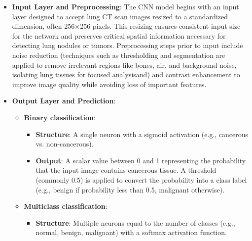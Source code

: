\begin{itemize}
    \item \textbf{Input Layer and Preprocessing}: The CNN model begins with an input layer designed 
    to accept lung CT scan images resized to a standardized dimension, often 256×256 pixels. This 
    resizing ensures consistent input size for the network and preserves critical spatial 
    information necessary for detecting lung nodules or tumors. Preprocessing steps prior to input 
    include noise reduction (techniques such as thresholding and segmentation are applied to remove 
    irrelevant regions like bones, air, and background noise, isolating lung tissues for focused 
    analysisand) and contrast enhancement to improve image quality while avoiding loss of important 
    features.\cite{aplb2024}

    \item \textbf{Output Layer and Prediction}: 
        \begin{itemize}
            \item \textbf{Binary classification}:
                \begin{itemize}
                    \item \textbf{Structure}: A single neuron with a sigmoid activation (e.g., 
                    cancerous vs. non-cancerous).
                    
                    \item \textbf{Output}: A scalar value between 0 and 1 representing the 
                    probability that the input image contains cancerous tissue. A threshold 
                    (commonly 0.5) is applied to convert the probability into a class label 
                    (e.g., benign if probability less than 0.5, malignant otherwise).
                \end{itemize}

            \item \textbf{Multiclass classification}: 
                \begin{itemize}
                    \item \textbf{Structure}: Multiple neurons equal to the number of classes (e.g., 
                    normal, benign, malignant) with a softmax activation function.
                    

\end{itemize}
\end{itemize}
\end{itemize}
